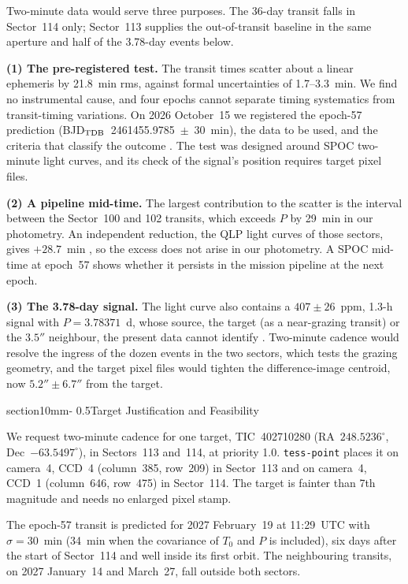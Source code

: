 \documentclass[letterpaper,11pt]{article}
\makeatletter
\renewcommand{\section}{\@startsection%
{section}{1}{0mm}{-\baselineskip}%
{0.5\baselineskip}{\normalfont\Large\bfseries}}%
\makeatother
\begin{document}
Two-minute data would serve three purposes. The 36-day transit falls in Sector~114 only; Sector~113 supplies the out-of-transit baseline in the same aperture and half of the 3.78-day events below.

\textbf{(1) The pre-registered test.} The transit times scatter about a linear ephemeris by 21.8~min rms, against formal uncertainties of 1.7--3.3~min. We find no instrumental cause, and four epochs cannot separate timing systematics from transit-timing variations. On 2026 October~15 we registered the epoch-57 prediction (BJD$_{\rm TDB}$~2461455.9785~$\pm$~30~min), the data to be used, and the criteria that classify the outcome \citep{PreReg}. The test was designed around SPOC two-minute light curves, and its check of the signal's position requires target pixel files.

\textbf{(2) A pipeline mid-time.} The largest contribution to the scatter is the interval between the Sector~100 and 102 transits, which exceeds $P$ by 29~min in our photometry. An independent reduction, the QLP light curves of those sectors, gives $+28.7$~min \citep{Vora2026}, so the excess does not arise in our photometry. A SPOC mid-time at epoch~57 shows whether it persists in the mission pipeline at the next epoch.

\textbf{(3) The 3.78-day signal.} The light curve also contains a $407 \pm 26$~ppm, 1.3-h signal with $P = 3.78371$~d, whose source, the target (as a near-grazing transit) or the $3.5''$ neighbour, the present data cannot identify \citep{Vora2026}. Two-minute cadence would resolve the ingress of the dozen events in the two sectors, which tests the grazing geometry, and the target pixel files would tighten the difference-image centroid, now $5.2'' \pm 6.7''$ from the target.

\section{Target Justification and Feasibility}

We request two-minute cadence for one target, TIC~402710280 (RA~$248.5236^\circ$, Dec~$-63.5497^\circ$), in Sectors~113 and~114, at priority 1.0. \texttt{tess-point} places it on camera~4, CCD~4 (column~385, row~209) in Sector~113 and on camera~4, CCD~1 (column~646, row~475) in Sector~114. The target is fainter than 7th magnitude and needs no enlarged pixel stamp.

The epoch-57 transit is predicted for 2027 February~19 at 11:29~UTC with $\sigma = 30$~min (34~min when the covariance of $T_0$ and $P$ is included), six days after the start of Sector~114 and well inside its first orbit. The neighbouring transits, on 2027 January~14 and March~27, fall outside both sectors.
\end{document}
